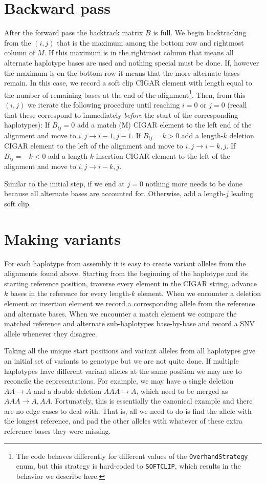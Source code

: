 \documentclass[nofootinbib,amssymb,amsmath]{revtex4}
\newcommand{\code}[1]{\texttt{#1}}
\begin{document}
\section{Backward pass}
After the forward pass the backtrack matrix $B$ is full.  We begin backtracking from the $(i,j)$ that is the maximum among the bottom row and rightmost column of $M$.  If this maximum is in the rightmost column that means all alternate haplotype bases are used and nothing special must be done.  If, however the maximum is on the bottom row it means that the more alternate bases remain.  In this case, we record a soft clip CIGAR element with length equal to the number of remaining bases at the end of the alignment\footnote{The code behaves differently for different values of the \code{OverhandStrategy} enum, but this strategy is hard-coded to \code{SOFTCLIP}, which results in the behavior we describe here.}.  Then, from this $(i,j)$ we iterate the following procedure until reaching $i = 0$ or $j = 0$ (recall that these correspond to immediately \textit{before} the start of the corresponding haplotypes): If $B_{ij} = 0$ add a match (M) CIGAR element to the left end of the alignment and move to $i,j \rightarrow i - 1, j - 1$.  If $B_{ij} = k > 0$ add a length-$k$ deletion CIGAR element to the left of the alignment and move to $i,j \rightarrow i - k, j$.  If $B_{ij} = -k < 0$ add a length-$k$ insertion CIGAR element to the left of the alignment and move to $i,j \rightarrow i - k, j$.  

Similar to the initial step, if we end at $j = 0$ nothing more needs to be done because all alternate bases are accounted for.  Otherwise, add a length-$j$ leading soft clip.

\section{Making variants}
For each haplotype from assembly it is easy to create variant alleles from the alignments found above.  Starting from the beginning of the haplotype and its starting reference position, traverse every element in the CIGAR string, advance $k$ bases in the reference for every length-$k$ element.  When we encounter a deletion element or insertion element we record a corresponding allele from the reference and alternate bases.  When we encounter a match element we compare the matched reference and alternate sub-haplotypes base-by-base and record a SNV allele whenever they disagree.

Taking all the unique start positions and variant alleles from all haplotypes give an initial set of variants to genotype but we are not quite done.  If multiple haplotypes have different variant alleles at the same position we may nee to reconcile the representations.  For example, we may have a single deletion $AA \rightarrow A$ and a double deletion $AAA \rightarrow A$, which need to be merged as $AAA \rightarrow A, AA$.  Fortunately, this is essentially the canonical example and there are no edge cases to deal with.  That is, all we need to do is find the allele with the longest reference, and pad the other alleles with whatever of these extra reference bases they were missing.
\end{document}
